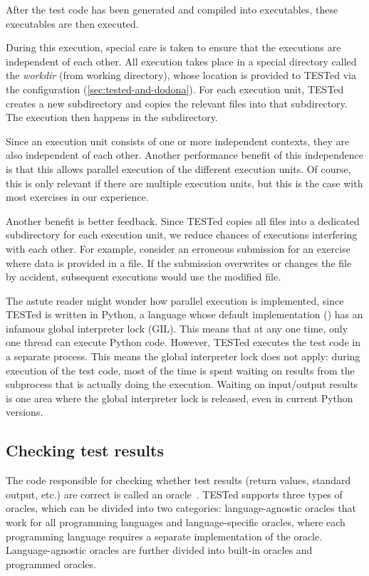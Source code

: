 \documentclass[../main]{subfiles}
\begin{document}
After the test code has been generated and compiled into executables, these executables are then executed.

During this execution, special care is taken to ensure that the executions are independent of each other.
All execution takes place in a special directory called the \emph{workdir} (from working directory), whose location is provided to TESTed via the configuration (\cref{sec:tested-and-dodona}).
For each execution unit, TESTed creates a new subdirectory and copies the relevant files into that subdirectory.
The execution then happens in the subdirectory.

Since an execution unit consists of one or more independent contexts, they are also independent of each other.
Another performance benefit of this independence is that this allows parallel execution of the different execution units.
Of course, this is only relevant if there are multiple execution units, but this is the case with most exercises in our experience.

Another benefit is better feedback.
Since TESTed copies all files into a dedicated subdirectory for each execution unit, we reduce chances of executions interfering with each other.
For example, consider an erroneous submission for an exercise where data is provided in a file.
If the submission overwrites or changes the file by accident, subsequent executions would use the modified file.

The astute reader might wonder how parallel execution is implemented, since TESTed is written in Python, a language whose default implementation () has an infamous global interpreter lock (GIL).
This means that at any one time, only one thread can execute Python code.
However, TESTed executes the test code in a separate process.
This means the global interpreter lock does not apply: during execution of the test code, most of the time is spent waiting on results from the subprocess that is actually doing the execution.
Waiting on input/output results is one area where the global interpreter lock is released, even in current Python versions.

\subsection{Checking test results}\label{subsec:checking-results}

The code responsible for checking whether test results (return values, standard output, etc.) are correct is called an oracle~\autocite{howdenTheoreticalEmpiricalStudies1978}.
TESTed supports three types of oracles, which can be divided into two categories: language-agnostic oracles that work for all programming languages and language-specific oracles, where each programming language requires a separate implementation of the oracle.
Language-agnostic oracles are further divided into built-in oracles and programmed oracles.
\end{document}
